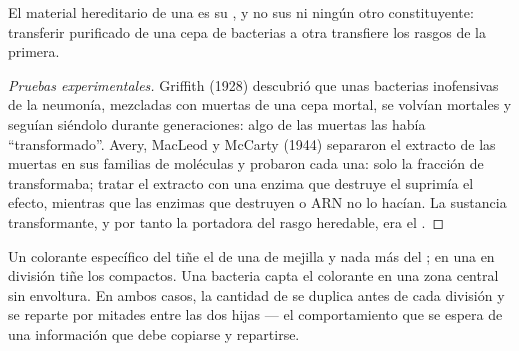 \begin{proposition}\label{prop:g10:universal-dna:material}
El material hereditario de una  es su , y no sus  ni
ningún otro constituyente: transferir  purificado de una cepa de
bacterias a otra transfiere los rasgos de la primera.
\end{proposition}
\begin{proof}[Pruebas experimentales]
Griffith (1928) descubrió que unas bacterias inofensivas de la neumonía,
mezcladas con  muertas de una cepa mortal, se volvían mortales y
seguían siéndolo durante generaciones: algo de las  muertas las
había ``transformado''. Avery, MacLeod y McCarty (1944) separaron el
extracto de las  muertas en sus familias de moléculas y probaron
cada una: solo la fracción de  transformaba; tratar el extracto con
una enzima que destruye el  suprimía el efecto, mientras que las
enzimas que destruyen  o ARN no lo hacían. La sustancia
transformante, y por tanto la portadora del rasgo heredable, era el .
\end{proof}

\begin{example}\label{ex:g10:universal-dna:where}
Un colorante específico del  tiñe el  de una  de mejilla
y nada más del ; en una  en división tiñe los
 compactos. Una bacteria capta el colorante en una zona
central sin envoltura. En ambos casos, la cantidad de  se duplica
antes de cada división y se reparte por mitades entre las dos 
hijas --- el comportamiento que se espera de una información que debe
copiarse y repartirse.
\end{example}

